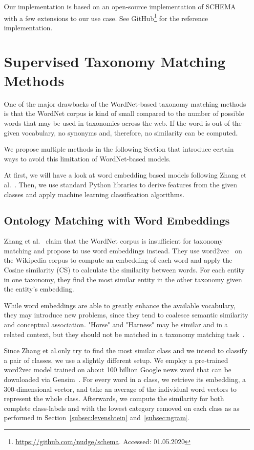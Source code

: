 Our implementation is based on an open-source implementation of SCHEMA with a few extensions to our use case.
See GitHub\footnote{\url{https://github.com/nudge/schema}. Accessed: 01.05.2020} for the reference implementation.

\section{Supervised Taxonomy Matching Methods}
\label{sec:supervised-taxo-match}

One of the major drawbacks of the WordNet-based taxonomy matching methods is that the WordNet corpus
is kind of small compared to the number of possible words that may be used in taxonomies across the web.
If the word is out of the given vocabulary, no synonyms and, therefore, no similarity can be computed.

We propose multiple methods in the following Section that introduce certain ways to avoid this limitation
of WordNet-based models.

At first, we will have a look at word embedding based models following Zhang et al.\@~\cite{zhang2014ontology}.
Then, we use standard Python libraries to derive features from the given classes and apply
machine learning classification algorithms.

\subsection{Ontology Matching with Word Embeddings}
\label{subsec:word-embeddings}

Zhang et al.\@~\cite{zhang2014ontology} claim that the WordNet corpus is insufficient for taxonomy matching and
propose to use word embeddings instead.
They use word2vec~\cite{mikolov2013distributed} on the Wikipedia corpus to compute an embedding of each word
and apply the Cosine similarity (CS) to calculate the similarity between words.
For each entity in one taxonomy, they find the most similar entity in the other taxonomy given the entity's embedding.

While word embeddings are able to greatly enhance the available vocabulary, they may introduce new problems,
since they tend to coalesce semantic similarity and conceptual association.
"Horse" and "Harness" may be similar and in a related context, but they should not be matched in
a taxonomy matching task~\cite{kolyvakis2018deepalignment}.

Since Zhang et al.\@ only try to find the most similar class
and we intend to classify a pair of classes, we use a slightly different setup.
We employ a pre-trained word2vec model trained on about 100 billion Google news word that can be downloaded
via Gensim~\cite{rehurek2010gensim}.
For every word in a class, we retrieve its embedding, a 300-dimensional vector, and take an average of the
individual word vectors to represent the whole class.
Afterwards, we compute the similarity for both complete class-labels and with the lowest category removed on each class as
as performed in Section~\ref{subsec:levenshtein} and~\ref{subsec:ngram}.

